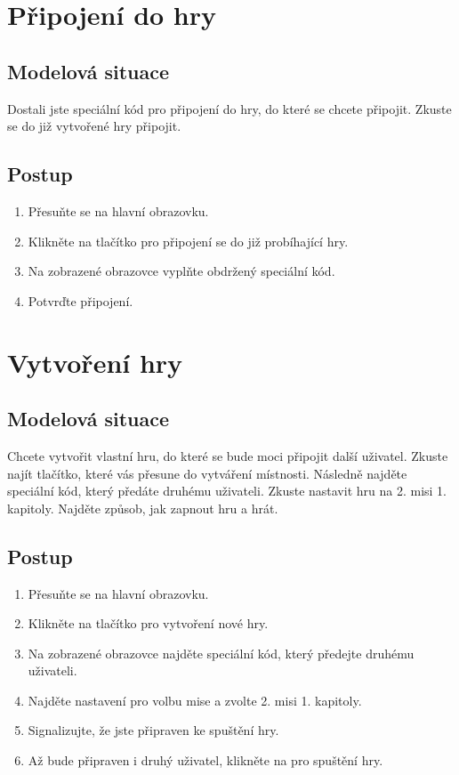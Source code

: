\section{Připojení do hry}
\label{scen:join}

\subsection*{Modelová situace}

Dostali jste speciální kód pro připojení do hry,
do které se chcete připojit.
Zkuste se do již vytvořené hry připojit.

\subsection*{Postup}

\begin{enumerate}
    \item Přesuňte se na hlavní obrazovku.
    \item Klikněte na tlačítko pro připojení se do již probíhající hry.
    \item Na zobrazené obrazovce vyplňte obdržený speciální kód.
    \item Potvrďte připojení.
\end{enumerate}

\section{Vytvoření hry}
\label{scen:create}

\subsection*{Modelová situace}

Chcete vytvořit vlastní hru,
do které se bude moci připojit další uživatel.
Zkuste najít tlačítko,
které vás přesune do vytváření místnosti.
Následně najděte speciální kód,
který předáte druhému uživateli.
Zkuste nastavit hru na 2. misi 1. kapitoly.
Najděte způsob, jak zapnout hru a hrát.

\subsection*{Postup}

\begin{enumerate}
    \item Přesuňte se na hlavní obrazovku.
    \item Klikněte na tlačítko pro vytvoření nové hry.
    \item Na zobrazené obrazovce najděte speciální kód,
    který předejte druhému uživateli.
    \item Najděte nastavení pro volbu mise a zvolte 2. misi 1. kapitoly.
    \item Signalizujte, že jste připraven ke spuštění hry.
    \item Až bude připraven i druhý uživatel,
    klikněte na pro spuštění hry.
\end{enumerate}

